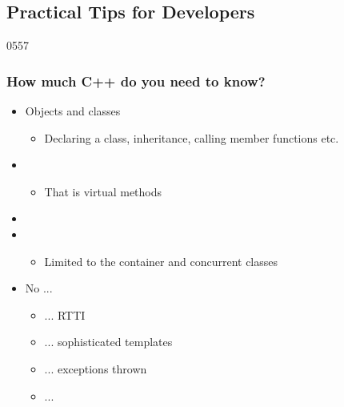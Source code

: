 %
%
%
%

\subsection{Practical Tips for Developers}

\begin{slide}{0557}
  \frametitle{How much C++ do you need to know?} \label{cpp_needed}
  \begin{itemize}
  \item Objects and classes
    \begin{itemize}
    \item Declaring a class, inheritance, calling member functions etc.
    \end{itemize}
  \item {}
    \begin{itemize}
    \item That is virtual methods
    \end{itemize}
  \item {}
  \item {}
    \begin{itemize}
    \item Limited to the container and concurrent classes
    \end{itemize}
  \item No ...
    \begin{itemize}
    \item ... RTTI
    \item ... sophisticated templates
    \item ... exceptions thrown
    \item ...
    \end{itemize}

  \end{itemize}
\end{slide}

